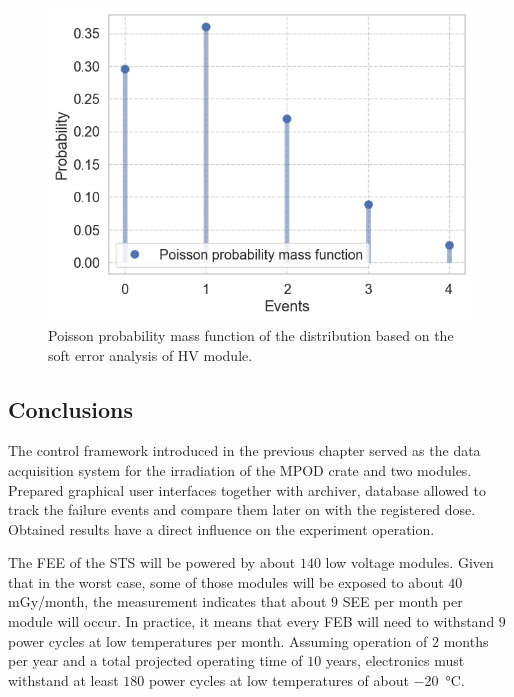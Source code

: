\begin{figure}[!h]
    \centering
    \includegraphics[width=0.65\columnwidth]{Chapter4/images/SIS18_HV.png}
    \caption{Poisson probability mass function of the distribution based on the soft error analysis of HV module.}
    \label{fig:sis18_hv}
\end{figure}



\subsection{Conclusions}

\label{irradiation_results}
The control framework introduced in the previous chapter served as the data acquisition system for the irradiation of the MPOD crate and two modules. Prepared graphical user interfaces together with archiver, database allowed to track the failure events and compare them later on with the registered dose. Obtained results have a direct influence on the experiment operation.

The \gls{FEE} of the \gls{STS} will be powered by about $140$ low voltage modules. Given that in the worst case, some of those modules will be exposed to about $40$\,mGy/month, the measurement indicates that about $9$ \gls{SEE} per month per module will occur. In practice, it means that every \gls{FEB} will need to withstand $9$ power cycles at low temperatures per month. Assuming operation of $2$ months per year and a total projected operating time of $10$ years, electronics must withstand at least $180$ power cycles at low temperatures of about \SI{-20}{\celsius}.
